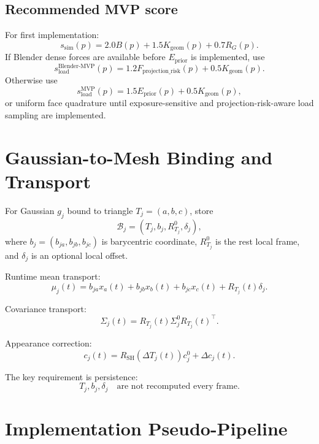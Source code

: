 \documentclass[11pt,a4paper]{article}
\begin{document}
\subsection{Recommended MVP score}

For first implementation:
\[
s_{\mathrm{sim}}(p)=2.0B(p)+1.5K_{\mathrm{geom}}(p)+0.7R_G(p).
\]
If Blender dense forces are available before $E_{\mathrm{prior}}$ is implemented, use
\[
s_{\mathrm{load}}^{\mathrm{Blender\text{-}MVP}}(p)=1.2F_{\mathrm{projection\_risk}}(p)+0.5K_{\mathrm{geom}}(p).
\]
Otherwise use
\[
s_{\mathrm{load}}^{\mathrm{MVP}}(p)=1.5E_{\mathrm{prior}}(p)+0.5K_{\mathrm{geom}}(p),
\]
or uniform face quadrature until exposure-sensitive and projection-risk-aware load sampling are implemented.

\section{Gaussian-to-Mesh Binding and Transport}

For Gaussian $g_j$ bound to triangle $T_j=(a,b,c)$, store
\[
\mathcal{B}_j=(T_j,b_j,R_{T_j}^0,\delta_j),
\]
where $b_j=(b_{ja},b_{jb},b_{jc})$ is barycentric coordinate, $R_{T_j}^0$ is the rest local frame, and $\delta_j$ is an optional local offset.

Runtime mean transport:
\[
\mu_j(t)=b_{ja}x_a(t)+b_{jb}x_b(t)+b_{jc}x_c(t)+R_{T_j}(t)\delta_j.
\]

Covariance transport:
\[
\Sigma_j(t)=R_{T_j}(t)\Sigma_j^0R_{T_j}(t)^\top.
\]

Appearance correction:
\[
c_j(t)=R_{\mathrm{SH}}(\Delta T_j(t))c_j^0+\Delta c_j(t).
\]

The key requirement is persistence:
\[
T_j,b_j,\delta_j\quad\text{are not recomputed every frame.}
\]

\section{Implementation Pseudo-Pipeline}
\end{document}
